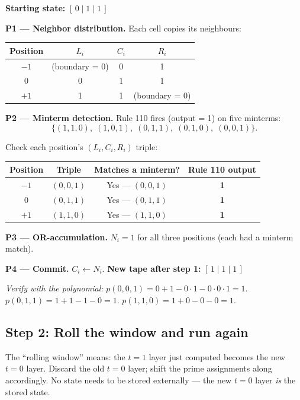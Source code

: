 \documentclass[11pt,a4paper]{article}
\begin{document}
\textbf{Starting state:} $[\,0\;|\;1\;|\;1\,]$

\medskip
\noindent\textbf{P1 — Neighbor distribution.}
Each cell copies its neighbours:
\begin{center}
\begin{tabular}{c|ccc}
\toprule
Position & $L_i$ & $C_i$ & $R_i$ \\
\midrule
$-1$ & (boundary = 0) & 0 & 1 \\
$ 0$ & 0 & 1 & 1 \\
$+1$ & 1 & 1 & (boundary = 0) \\
\bottomrule
\end{tabular}
\end{center}

\medskip
\noindent\textbf{P2 — Minterm detection.}
Rule 110 fires (output = 1) on five minterms:
\[
  \{(1,1,0),\;(1,0,1),\;(0,1,1),\;(0,1,0),\;(0,0,1)\}.
\]

Check each position's $(L_i, C_i, R_i)$ triple:
\begin{center}
\begin{tabular}{c|c|c|c}
\toprule
Position & Triple & Matches a minterm? & Rule 110 output \\
\midrule
$-1$ & $(0, 0, 1)$ & Yes — $(0,0,1)$ & \textbf{1} \\
$ 0$ & $(0, 1, 1)$ & Yes — $(0,1,1)$ & \textbf{1} \\
$+1$ & $(1, 1, 0)$ & Yes — $(1,1,0)$ & \textbf{1} \\
\bottomrule
\end{tabular}
\end{center}

\noindent\textbf{P3 — OR-accumulation.}
$N_i = 1$ for all three positions (each had a minterm match).

\noindent\textbf{P4 — Commit.}
$C_i \leftarrow N_i$.  \textbf{New tape after step 1:} $[\,1\;|\;1\;|\;1\,]$

\medskip
\textit{Verify with the polynomial:}
$p(0,0,1) = 0 + 1 - 0\cdot1 - 0\cdot0\cdot1 = 1$.\;\checkmark\quad
$p(0,1,1) = 1 + 1 - 1 - 0 = 1$.\;\checkmark\quad
$p(1,1,0) = 1 + 0 - 0 - 0 = 1$.\;\checkmark

\subsection{Step 2: Roll the window and run again}

The ``rolling window'' means: the $t=1$ layer just computed becomes the
new $t=0$ layer.  Discard the old $t=0$ layer; shift the prime assignments
along accordingly.  No state needs to be stored externally — the new
$t=0$ layer \emph{is} the stored state.
\end{document}
